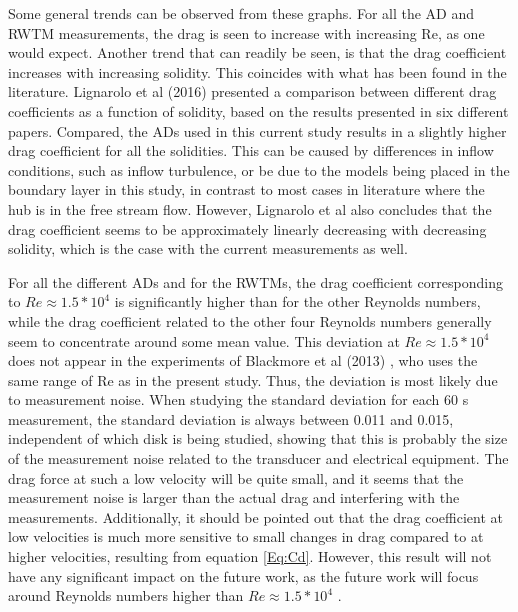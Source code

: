 Some general trends can be observed from these graphs. For all the \gls{AD} and \gls{RWTM} measurements, the drag is seen to increase with increasing Re, as one would expect. Another trend that can readily be seen, is that the drag coefficient increases with increasing solidity. This coincides with what has been found in the literature. Lignarolo et al (2016) \cite{Lignarolo2016} presented a comparison between different drag coefficients as a function of solidity, based on the results presented in six different papers. Compared, the \gls{AD}s used in this current study results in a slightly higher drag coefficient for all the solidities. This can be caused by differences in inflow conditions, such as inflow turbulence, or be due to the models being placed in the boundary layer in this study, in contrast to most cases in literature where the hub is in the free stream flow. However, Lignarolo et al also concludes that the drag coefficient seems to be approximately linearly decreasing with decreasing solidity, which is the case with the current measurements as well. 

For all the different \gls{AD}s and for the \gls{RWTM}s, the drag coefficient corresponding to $Re \approx 1.5*10^4$ is significantly higher than for the other Reynolds numbers, while the drag coefficient related to the other four Reynolds numbers generally seem to concentrate around some mean value. This deviation at $Re \approx 1.5*10^4$ does not appear in the experiments of Blackmore et al (2013) \cite{Blackmore2013}, who uses the same range of Re as in the present study. Thus, the deviation is most likely due to measurement noise. When studying the standard deviation for each 60 \si{\s} measurement, the standard deviation is always between 0.011 and 0.015, independent of which disk is being studied, showing that this is probably the size of the measurement noise related to the transducer and electrical equipment. The drag force at such a low velocity will be quite small, and it seems that the measurement noise is larger than the actual drag and interfering with the measurements. Additionally, it should be pointed out that the drag coefficient at low velocities is much more sensitive to small changes in drag compared to at higher velocities, resulting from equation \ref{Eq:Cd}. However, this result will not have any significant impact on the future work, as the future work will focus around Reynolds numbers higher than $Re \approx 1.5*10^4$ .

